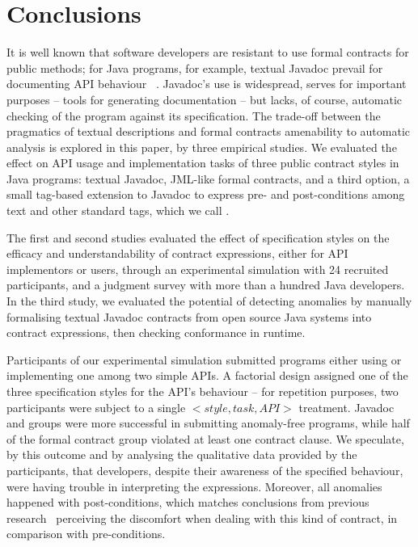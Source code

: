 \section{Conclusions}
\label{sec:conclusions}

It is well known that software developers are resistant to use formal contracts for public methods; for Java programs, for example, textual Javadoc prevail for documenting API behaviour ~\cite{docAnalysis}.
Javadoc's use is widespread, serves for important purposes -- tools for generating documentation -- but lacks, of course, automatic checking of the program against its specification.
The trade-off between the pragmatics of textual descriptions and formal contracts amenability to automatic analysis is explored in this paper, by three empirical studies.
We evaluated the effect on API usage and implementation tasks of three public contract styles in Java programs: textual Javadoc, JML-like formal contracts, and a third option, a small tag-based extension to Javadoc to express pre- and post-conditions among text and other standard tags, which we call \contractjdoc{}.

The first and second studies evaluated the effect of specification styles on the efficacy and understandability of contract expressions, either for API implementors or users, through an experimental simulation with 24 recruited participants, and a judgment survey with more than a hundred Java developers.
In the third study, we evaluated the potential of detecting anomalies by manually formalising textual Javadoc contracts from open source Java systems into contract expressions, then checking conformance in runtime.


Participants of our experimental simulation submitted programs either using or implementing one among two simple APIs. A factorial design assigned one of the three specification styles for the API's behaviour -- for repetition purposes, two participants were subject to a single $<style,task,API>$ treatment.
Javadoc and \contractjdoc{} groups were more successful in submitting anomaly-free programs, while half of the formal contract group violated at least one contract clause. 
We speculate, by this outcome and by analysing the qualitative data provided by the participants, that developers, despite their awareness of the specified behaviour, were having trouble in interpreting the expressions.  
Moreover, all anomalies happened with post-conditions, which matches conclusions from previous research~\cite{Estler-etal14,sac2017} perceiving the discomfort when dealing with this kind of contract, in comparison with pre-conditions. 


